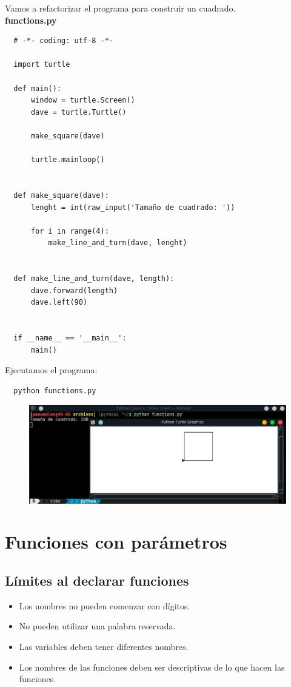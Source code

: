 \documentclass{article}
\begin{document}
Vamos a refactorizar el programa para construir un cuadrado.\\

\textbf{functions.py}
\begin{verbatim}
  # -*- coding: utf-8 -*-

  import turtle

  def main():
      window = turtle.Screen()
      dave = turtle.Turtle()

      make_square(dave)

      turtle.mainloop()


  def make_square(dave):
      lenght = int(raw_input('Tamaño de cuadrado: '))

      for i in range(4):
          make_line_and_turn(dave, lenght)


  def make_line_and_turn(dave, length):
      dave.forward(length)
      dave.left(90)


  if __name__ == '__main__':
      main()
\end{verbatim}

Ejecutamos el programa:

\begin{verbatim}
  python functions.py
\end{verbatim}

\begin{figure}[h!]
  \centering
  \includegraphics[scale=0.75]{./Pictures/023_function_square.png}
\end{figure}

\newpage

\section{Funciones con parámetros}%
\subsection{Límites al declarar funciones}%
\begin{itemize}
  \item Los nombres no pueden comenzar con dígitos.
  \item No pueden utilizar una palabra reservada.
  \item Las variables deben tener diferentes nombres.
  \item Los nombres de las funciones deben ser descriptivas de lo que hacen las
    funciones.
\end{itemize}
\end{document}
